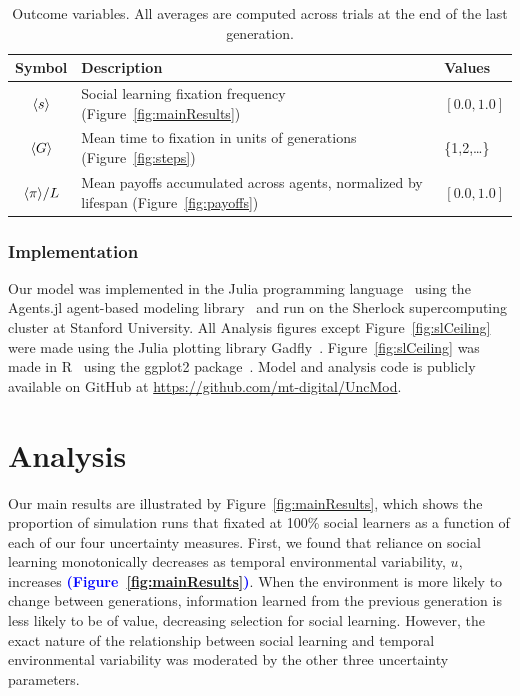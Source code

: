 \documentclass[letterpaper,11.5pt]{scrartcl}
\newcommand{\edit}[1]{{\bfseries \textcolor{blue} {#1}}}
\begin{document}
\begin{table}[h]
    \caption{Outcome variables. All averages are computed across trials at the end of the last generation.}
    \label{tab:outcomeVariables}
    \centering %
    \begin{tabular}{clp{0.85in}} \toprule

        Symbol & Description & Values \\ 

        \midrule  

        $\langle s \rangle$ & Social learning fixation frequency (Figure~\ref{fig:mainResults})
                  &  $[0.0, 1.0]$ \\

        $\langle G \rangle$ & Mean time to fixation in units of generations (Figure~\ref{fig:steps}) & \{1,2,\ldots\} \\

        $\langle \pi \rangle / L$ & Mean payoffs accumulated across agents, normalized by
        lifespan (Figure~\ref{fig:payoffs}) & $ [0.0, 1.0]$ \\

        \bottomrule
    \end{tabular}
\end{table}





\subsubsection{Implementation}

Our model was implemented in the Julia programming language~\citep{Bezanson2017} 
using the Agents.jl agent-based modeling library~\citep{Datseris2022} and run
on the Sherlock supercomputing cluster at Stanford University. All Analysis figures
except Figure~\ref{fig:slCeiling} were made using the Julia plotting
library Gadfly~\citep{Jones2021b}. Figure~\ref{fig:slCeiling} was made in R~\citep{R}
using the ggplot2 package~\citep{ggplot2}. 
Model and analysis code is publicly available on GitHub at \url{https://github.com/mt-digital/UncMod}.


\section{Analysis}

Our main results are illustrated by Figure~\ref{fig:mainResults}, which shows the
proportion of simulation runs that fixated at 100\% social learners as a function of
each of our four uncertainty measures. First, we found that reliance on social
learning monotonically decreases as temporal environmental variability, $u$,
increases \edit{(Figure~\ref{fig:mainResults})}. 
When the environment is more likely to change between generations,
information learned from the previous generation is less likely to be of value,
decreasing selection for social learning.  
However, the exact nature of the relationship between social
learning and temporal environmental variability was moderated by the other three uncertainty parameters. 
\end{document}
